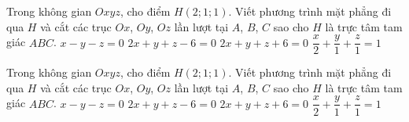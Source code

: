 \begin{vd}%
	Trong không gian $Oxyz$, cho điểm $H(2;1;1)$. Viết phương trình mặt phẳng đi qua $H$ và cắt các trục $Ox$, $Oy$, $Oz$ lần lượt tại $A$, $B$, $C$ sao cho $H$ là trực tâm tam giác $ABC$.
	\choice
	{$x-y-z=0$}
	{\True $2x+y+z-6=0$}
	{$2x+y+z+6=0$}
	{$\dfrac{x}{2}+\dfrac{y}{1}+\dfrac{z}{1}=1$}
\end{vd}

\begin{vd}%
	Trong không gian $Oxyz$, cho điểm $H(2;1;1)$. Viết phương trình mặt phẳng đi qua $H$ và cắt các trục $Ox$, $Oy$, $Oz$ lần lượt tại $A$, $B$, $C$ sao cho $H$ là trực tâm tam giác $ABC$.
	\choice
	{$x-y-z=0$}
	{\True $2x+y+z-6=0$}
	{$2x+y+z+6=0$}
	{$\dfrac{x}{2}+\dfrac{y}{1}+\dfrac{z}{1}=1$}
\end{vd}

